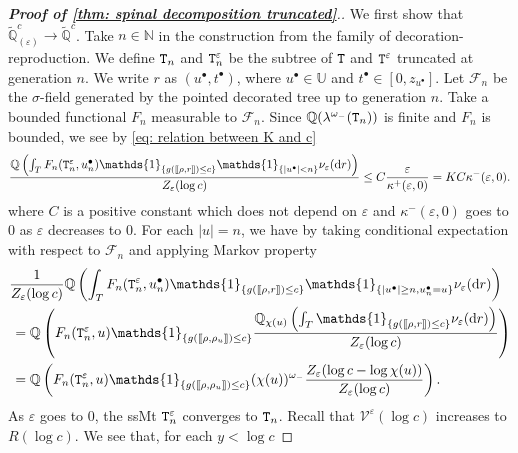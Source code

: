 \documentclass[12pt]{article}
\def\llbracket{[\hspace{-.10em} [ }
\def\rrbracket{ ] \hspace{-.10em}]}
\numberwithin{equation}{section}
\theoremstyle{plain}
\theoremstyle{definition}
\newcommand{\D}{\mathrm{d}}
\begin{document}
\begin{proof}[\textbf{Proof of \cref{thm: spinal decomposition truncated}}.]
We first show that $\tilde{\mathbb{Q}}^c_{(\varepsilon)} \to \tilde{\mathbb{Q}}^c$. Take $n\in \mathbb N$ in the construction from the family of decoration-reproduction. We define ${\tt T}_n$ and ${\tt T}_n^{\varepsilon}$ be the subtree of $\tt T$ and $\tt T^{\varepsilon}$ truncated at generation $n$. We write $r$ as $(u^\bullet,t^\bullet)$, where $u^\bullet\in \mathbb U$ and $t^\bullet\in [0,z_{u^\bullet}]$. Let $\mathcal F_n$ be the $\sigma$-field generated by the pointed decorated tree up to generation $n$. Take a bounded functional $F_n$ measurable to $\mathcal{F}_n$. Since $\mathbb Q(\lambda^{\omega_-}({\tt T}_n))$ is finite and $F_n$ is bounded, we see by \eqref{eq: relation between K and c}
\begin{align*}
     \frac{ \mathbb Q\left(\int_T F_n({\tt T}^\varepsilon_n,u^{\bullet}_n)  \mathds{1}_{\{g(\llbracket \rho, r \rrbracket)\le c \}}\mathds{1}_{\{|u^\bullet|< n\}}\nu_{\varepsilon}(\D r) \right)}{Z_{\varepsilon}(\log c)}\le C \frac{\varepsilon}{\kappa^+(\varepsilon,0)} = KC\kappa^-(\varepsilon,0).
\end{align*}
where $C$ is a positive constant which does not depend on $\varepsilon$ and $\kappa^-(\varepsilon,0)$ goes to $0$ as $\varepsilon$ decreases to $0$. For each $|u|=n$, we have by taking conditional expectation with respect to $\mathcal{F}_n$ and applying Markov property
\begin{equation}\label{eq: prob to choose u}
\begin{split}
&\frac{1}{Z_{\varepsilon}(\log c)}\mathbb Q\left(\int_T F_n({\tt T}_n^\varepsilon,u^{\bullet}_n) \mathds{1}_{\{g(\llbracket \rho, r \rrbracket)\le c \}}\mathds{1}_{\{|u^\bullet|\ge n,u^\bullet_n=u\}}\nu_{\varepsilon}(\D r) \right)\\
&\,= \mathbb Q\left(F_n({\tt T}_n^\varepsilon,u)\mathds{1}_{\{g(\llbracket \rho,\rho_u \rrbracket)\le c\}}\frac{\mathbb Q_{\chi(u)}\left(\int_T \mathds{1}_{\{g(\llbracket \rho, r \rrbracket)\le c \}}\nu_{\varepsilon}(\D r) \right)}{Z_{\varepsilon}(\log c)}\right)\\
&\,= \mathbb Q\left(F_n({\tt T}_n^\varepsilon,u)\mathds{1}_{\{g(\llbracket \rho,\rho_u \rrbracket)\le c\}}(\chi(u))^{\omega_-}\frac{ Z_{\varepsilon}(\log c-\log \chi(u))}{Z_{\varepsilon}(\log c)}\right).
\end{split}
\end{equation}
As $\varepsilon$ goes to $0$, the ssMt ${\tt T}^{\varepsilon}_n$ converges to ${\tt T}_n$. Recall that $\mathscr{V}^{\varepsilon}(\log c)$ increases to $R(\log c)$. We see that, for each $y<\log c$

\end{proof}
\end{document}
